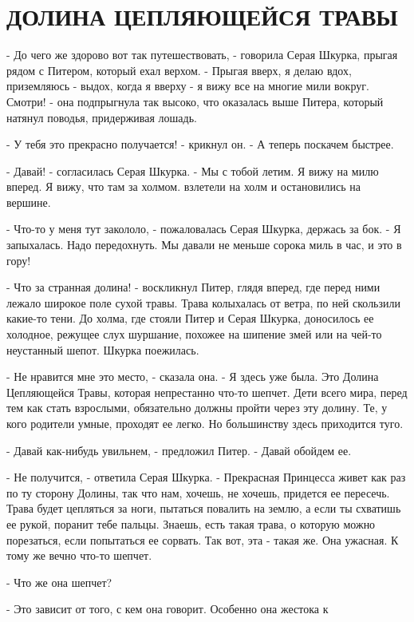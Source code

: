 \chapter{ДОЛИНА ЦЕПЛЯЮЩЕЙСЯ ТРАВЫ}
\par\par- До чего же здорово вот так путешествовать, - говорила Серая 
Шкурка, прыгая рядом с Питером, который ехал верхом. - Прыгая вверх, я 
делаю вдох, приземляюсь - выдох, когда я вверху - я вижу все на многие 
мили вокруг. Смотри! - она подпрыгнула так высоко, что оказалась выше 
Питера, который натянул поводья, придерживая лошадь.
\par- У тебя это прекрасно получается! - крикнул он. - А теперь 
поскачем быстрее.
\par- Давай! - согласилась Серая Шкурка. - Мы с тобой летим. Я вижу на 
милю вперед. Я вижу, что там за холмом.
 взлетели на холм и остановились на вершине.
\par- Что-то у меня тут закололо, - пожаловалась Серая Шкурка, держась 
за бок. - Я запыхалась. Надо передохнуть. Мы давали не меньше сорока 
миль в час, и это в гору!
\par- Что за странная долина! - воскликнул Питер, глядя вперед, где 
перед ними лежало широкое поле сухой травы. Трава колыхалась от ветра, 
по ней скользили какие-то тени. До холма, где стояли Питер и Серая 
Шкурка, доносилось ее холодное, режущее слух шуршание, похожее на 
шипение змей или на чей-то неустанный шепот.
 Шкурка поежилась.
\par- Не нравится мне это место, - сказала она. - Я здесь уже была. 
Это Долина Цепляющейся Травы, которая непрестанно что-то шепчет. Дети 
всего мира, перед тем как стать взрослыми, обязательно должны пройти 
через эту долину. Те, у кого родители умные, проходят ее легко. Но 
большинству здесь приходится туго.
\par- Давай как-нибудь увильнем, - предложил Питер. - Давай обойдем 
ее.
\par- Не получится, - ответила Серая Шкурка. - Прекрасная Принцесса 
живет как раз по ту сторону Долины, так что нам, хочешь, не хочешь, 
придется ее пересечь. Трава будет цепляться за ноги, пытаться повалить 
на землю, а если ты схватишь ее рукой, поранит тебе пальцы. Знаешь, 
есть такая трава, о которую можно порезаться, если попытаться ее 
сорвать. Так вот, эта - такая же. Она ужасная. К тому же вечно что-то 
шепчет.
\par- Что же она шепчет?
\par- Это зависит от того, с кем она говорит. Особенно она жестока к 
